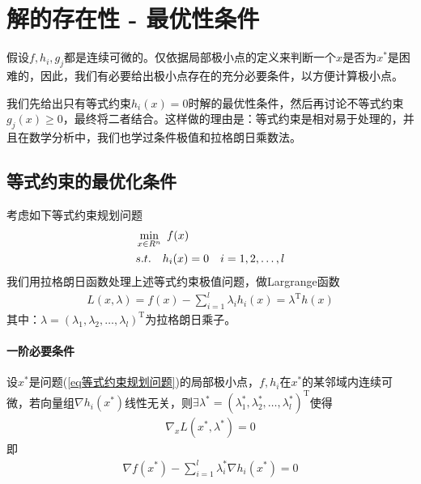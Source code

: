 \section{解的存在性 - 最优性条件}
    \par
    假设$f,h_i,g_j$都是连续可微的。仅依据局部极小点的定义来判断一个$x$是否为$x^*$是困难的，因此，我们有必要给出极小点存在的充分必要条件，以方便计算极小点。
    \par
    我们先给出只有等式约束$h_i(x)=0$时解的最优性条件，然后再讨论不等式约束$g_j(x) \geqslant 0$，最终将二者结合。这样做的理由是：等式约束是相对易于处理的，并且在数学分析中，我们也学过条件极值和拉格朗日乘数法。
    \subsection{等式约束的最优化条件}
        \par
        考虑如下等式约束规划问题
        \begin{align}
        \label{eq等式约束规划问题}
        &\mathop {\min}\limits_{x\in R^n}\  f(x)\\
        &s.t.\quad h_i(x)=0\quad i=1,2,\ldots,l\notag
        \end{align}
        我们用拉格朗日函数处理上述等式约束极值问题，做Largrange函数
        \begin{align*}
        L(x,\lambda)=f(x)-\mathop {\sum}\limits_{i=1}^l{\lambda}_i h_i(x)=\lambda^\mathrm{T}h(x)
        \end{align*}
        其中：$\lambda=({\lambda}_1,{\lambda}_2,\ldots,{\lambda}_l)^\mathrm{T} $为拉格朗日乘子。
        \paragraph{一阶必要条件}
        设$x^*$是问题(\ref{eq等式约束规划问题})的局部极小点，$f,h_i$在$x^*$的某邻域内连续可微，若向量组$\nabla h_i(x^*)$线性无关，则$\exists {\lambda}^*=({\lambda}_1^*,{\lambda}_2^*,\ldots,{\lambda}_l^*)^\mathrm{T} $使得
        \begin{align*}
        {\nabla}_xL(x^*,{\lambda}^*)=0
        \end{align*}
        即
        \begin{align*}
        \nabla f(x^*) - \sum_{i=1}^l\lambda_i^*\nabla h_i(x^*) = 0
        \end{align*}
